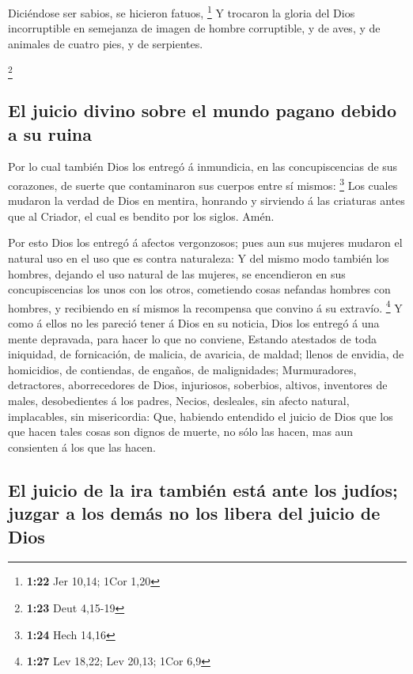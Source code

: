 Diciéndose ser sabios, se hicieron fatuos, \footnote{\textbf{1:22}
  Jer 10,14; 1Cor 1,20}  Y trocaron la gloria del Dios
incorruptible en semejanza de imagen de hombre corruptible, y de aves, y
de animales de cuatro pies, y de serpientes.

\footnote{\textbf{1:23} Deut 4,15-19}

\hypertarget{el-juicio-divino-sobre-el-mundo-pagano-debido-a-su-ruina}{%
\subsection{El juicio divino sobre el mundo pagano debido a su
ruina}\label{el-juicio-divino-sobre-el-mundo-pagano-debido-a-su-ruina}}

 Por lo cual también Dios los entregó á inmundicia, en las
concupiscencias de sus corazones, de suerte que contaminaron sus cuerpos
entre sí mismos: \footnote{\textbf{1:24} Hech 14,16}  Los
cuales mudaron la verdad de Dios en mentira, honrando y sirviendo á las
criaturas antes que al Criador, el cual es bendito por los siglos. Amén.

 Por esto Dios los entregó á afectos vergonzosos; pues aun
sus mujeres mudaron el natural uso en el uso que es contra naturaleza:
 Y del mismo modo también los hombres, dejando el uso
natural de las mujeres, se encendieron en sus concupiscencias los unos
con los otros, cometiendo cosas nefandas hombres con hombres, y
recibiendo en sí mismos la recompensa que convino á su extravío.
\footnote{\textbf{1:27} Lev 18,22; Lev 20,13; 1Cor 6,9}  Y
como á ellos no les pareció tener á Dios en su noticia, Dios los entregó
á una mente depravada, para hacer lo que no conviene, 
Estando atestados de toda iniquidad, de fornicación, de malicia, de
avaricia, de maldad; llenos de envidia, de homicidios, de contiendas, de
engaños, de malignidades;  Murmuradores, detractores,
aborrecedores de Dios, injuriosos, soberbios, altivos, inventores de
males, desobedientes á los padres,  Necios, desleales, sin
afecto natural, implacables, sin misericordia:  Que,
habiendo entendido el juicio de Dios que los que hacen tales cosas son
dignos de muerte, no sólo las hacen, mas aun consienten á los que las
hacen.

\hypertarget{el-juicio-de-la-ira-tambiuxe9n-estuxe1-ante-los-juduxedos-juzgar-a-los-demuxe1s-no-los-libera-del-juicio-de-dios}{%
\subsection{El juicio de la ira también está ante los judíos; juzgar a
los demás no los libera del juicio de
Dios}\label{el-juicio-de-la-ira-tambiuxe9n-estuxe1-ante-los-juduxedos-juzgar-a-los-demuxe1s-no-los-libera-del-juicio-de-dios}}

